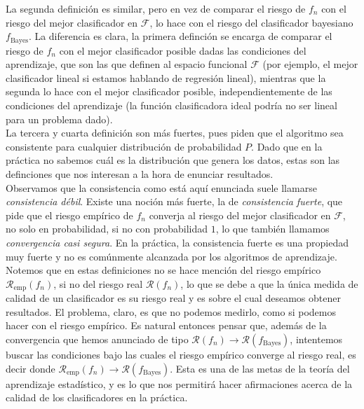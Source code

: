 \documentclass{article}
\begin{document}
La segunda definición es similar, pero en vez de comparar el riesgo de $f_n$ con el riesgo del mejor clasificador en $\mathcal{F}$,
lo hace con el riesgo del clasificador bayesiano $f_{\text{Bayes}}$. La diferencia es clara, la primera definción se encarga de 
comparar el riesgo de $f_n$ con el mejor clasificador posible dadas las condiciones del aprendizaje, que son las que definen al espacio funcional 
$\mathcal{F}$ (por ejemplo, el mejor clasificador lineal si estamos hablando de regresión lineal), mientras que la segunda lo hace con el
mejor clasificador posible, independientemente de las condiciones del aprendizaje (la función clasificadora ideal podría no ser lineal
para un problema dado).\\

La tercera y cuarta definición son más fuertes, pues piden que el algoritmo sea consistente para cualquier distribución de probabilidad $P$.
Dado que en la práctica no sabemos cuál es la distribución que genera los datos, estas son las definciones que nos interesan a la hora de 
enunciar resultados.\\

Observamos que la consistencia como está aquí enunciada suele llamarse \textit{consistencia débil}. Existe una noción más fuerte, la de
\textit{consistencia fuerte}, que pide que el riesgo empírico de $f_n$ converja al riesgo del mejor clasificador en $\mathcal{F}$, no solo
en probabilidad, si no con probabilidad $1$, lo que también llamamos \textit{convergencia casi segura}. En la práctica, la consistencia fuerte es una propiedad muy fuerte y no es comúnmente
alcanzada por los algoritmos de aprendizaje.\\

Notemos que en estas definiciones no se hace mención del riesgo empírico $\mathcal{R}_{\text{emp}}(f_n)$, si no del riesgo real $\mathcal{R}(f_n)$, lo que
se debe a que la única medida de calidad de un clasificador es su riesgo real y es sobre el cual deseamos obtener resultados. El problema, claro,
es que no podemos medirlo, como si podemos hacer con el riesgo empírico. Es natural entonces pensar que, además de la convergencia que hemos anunciado
de tipo $\mathcal{R}(f_n) \rightarrow \mathcal{R}(f_{\text{Bayes}})$, intentemos buscar las condiciones bajo las cuales el riesgo empírico
converge al riesgo real, es decir donde  $\mathcal{R}_{\text{emp}}(f_n) \rightarrow \mathcal{R}(f_{\text{Bayes}})$. Esta es una de las metas
de la teoría del aprendizaje estadístico, y es lo que nos permitirá hacer afirmaciones acerca de la calidad de los clasificadores en la práctica.\\
\end{document}
